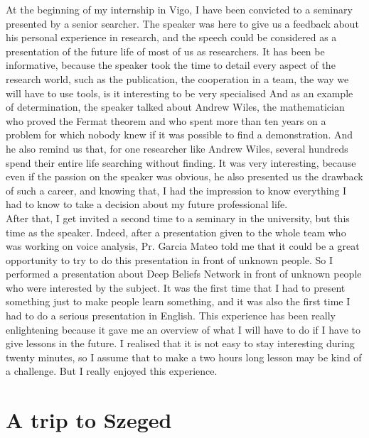 \documentclass{report}
\begin{document}
	At the beginning of my internship in Vigo, I have been convicted to a seminary presented by a senior searcher. The speaker was here to give us a feedback about his personal experience in research, and the speech could be considered as a presentation of the future life of most of us as researchers. It has been be informative, because the speaker took the time to detail every aspect of the research world, such as the publication, the cooperation in a team, the way we will have to use tools, is it interesting to be very specialised And as an example of determination, the speaker talked about Andrew Wiles, the mathematician who proved the Fermat theorem and who spent more than ten years on a problem for which nobody knew if it was possible to find a demonstration. And he also remind us that, for one researcher like Andrew Wiles, several hundreds spend their entire life searching without finding. It was very interesting, because even if the passion on the speaker was obvious, he also presented us the drawback of such a career, and knowing that, I had the impression to know everything I had to know to take a decision about my future professional life.\\
	
	After that, I get invited a second time to a seminary in the university, but this time as the speaker. Indeed, after a presentation given to the whole team who was working on voice analysis, Pr. Garcia Mateo told me that it could be a great opportunity to try to do this presentation in front of unknown people. So I performed a presentation about Deep Beliefs Network in front of unknown people who were interested by the subject. It was the first time that I had to present something just to make people learn something, and it was also the first time I had to do a serious presentation in English. This experience has been really enlightening because it gave me an overview of what I will have to do if I have to give lessons in the future. I realised that it is not easy to stay interesting during twenty minutes, so I assume that to make a two hours long lesson may be kind of a challenge. But I really enjoyed this experience.
	
	\section{A trip to Szeged}
	
\end{document}
